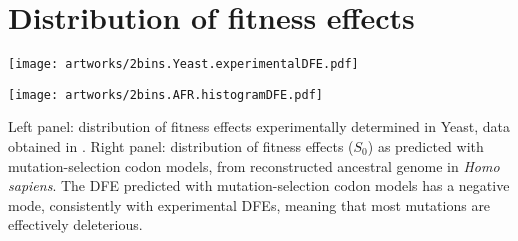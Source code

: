 \documentclass{article}
\newcommand{\Sphy}{S_{0}}
\begin{document}
    \section{Distribution of fitness effects}
    \begin{minipage}{0.49\linewidth}
        \texttt{[image: artworks/2bins.Yeast.experimentalDFE.pdf]}
    \end{minipage}
    \begin{minipage}{0.49\linewidth}
        \texttt{[image: artworks/2bins.AFR.histogramDFE.pdf]}
    \end{minipage}
    Left panel: distribution of fitness effects experimentally determined in Yeast, data obtained in \textcite{shen_synonymous_2022}.
    Right panel:  distribution of fitness effects ($\Sphy$) as predicted with mutation-selection codon models, from reconstructed ancestral genome in \textit{Homo sapiens}.
    The DFE predicted with mutation-selection codon models has a negative mode, consistently with experimental DFEs, meaning that most mutations are effectively deleterious.

    \newpage
\end{document}

